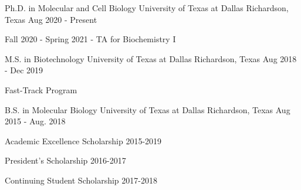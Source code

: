 

\begin{cventries}

	\cventry
	{Ph.D. in Molecular and Cell Biology} %
	{University of Texas at Dallas} %
	{Richardson, Texas} %
	{Aug 2020 - Present} %
	{
		\begin{cvitems} %
			\item {Fall 2020 - Spring 2021 - TA for Biochemistry I}
		\end{cvitems}
	}

	\cventry
	{M.S. in Biotechnology} %
	{University of Texas at Dallas} %
	{Richardson, Texas} %
	{Aug 2018 - Dec 2019} %
	{
		\begin{cvitems} %
			\item {Fast-Track Program}
		\end{cvitems}
	}

	\cventry
	{B.S. in Molecular Biology} %
	{University of Texas at Dallas} %
	{Richardson, Texas} %
	{Aug 2015 - Aug. 2018} %
	{
		\begin{cvitems} %
			\item {Academic Excellence Scholarship 2015-2019}
			\item {President's Scholarship 2016-2017}
			\item {Continuing Student Scholarship 2017-2018}
		\end{cvitems}
	}

\end{cventries}
